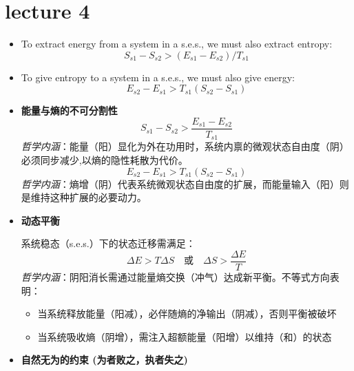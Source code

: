 \section{lecture 4}
\begin{thm}
    \indent
    \begin{itemize}
        \item To extract energy from a system in a s.e.s., we must also extract entropy:
        \[
        S_{s1} - S_{s2} > (E_{s1} - E_{s2}) / T_{s1}
        \]
        \item To give entropy to a system in a s.e.s., we must also give energy:
        \[
        E_{s2} - E_{s1} > T_{s1}(S_{s2} - S_{s1})
        \]
    \end{itemize}
    \begin{add}
\begin{itemize}
    \item \textbf{能量与熵的不可分割性}  
    \[
    S_{s1} - S_{s2} > \frac{E_{s1} - E_{s2}}{T_{s1}}
    \]
    \textit{哲学内涵}：能量（阳）显化为外在功用时，系统内禀的微观状态自由度（阴）必须同步减少,以熵的隐性耗散为代价。
    \[
    E_{s2} - E_{s1} > T_{s1}(S_{s2} - S_{s1})
    \]
    \textit{哲学内涵}：熵增（阴）代表系统微观状态自由度的扩展，而能量输入（阳）则是维持这种扩展的必要动力。
    \item \textbf{动态平衡}  
    
    系统稳态（s.e.s.）下的状态迁移需满足：
    \[
    \Delta E > T\Delta S \quad \text{或} \quad \Delta S > \frac{\Delta E}{T}
    \]
    \textit{哲学内涵}：阴阳消长需通过能量\textminus 熵交换（冲气）达成新平衡。不等式方向表明：
    \begin{itemize}
        \item 当系统释放能量（阳减），必伴随熵的净输出（阴减），否则平衡被破坏
        \item 当系统吸收熵（阴增），需注入超额能量（阳增）以维持（和）的状态
    \end{itemize}

    \item \textbf{自然无为的约束 (为者败之，执者失之) }
    

\end{itemize}
\end{add}
\end{thm}
